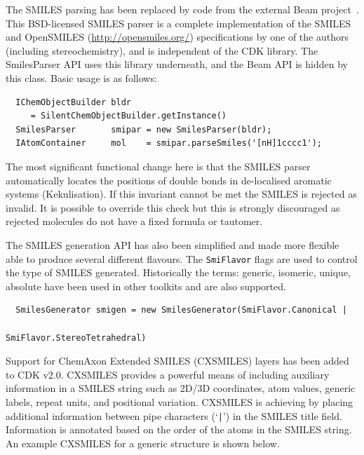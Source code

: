\documentclass[10pt]{bmcart}
\def \cdkversion {v2.0}
\begin{document}
The SMILES parsing has been replaced by code from the external Beam project~\cite{Beam}.
This BSD-licensed SMILES parser is a complete implementation of the SMILES
and OpenSMILES (\url{http://opensmiles.org/}) specifications by one of the
authors (including stereochemistry), and is independent of
the CDK library. The SmilesParser API uses this library underneath, and the
Beam API is hidden by this class. Basic usage is as follows:

\vspace{0.2cm}
\begin{verbatim}
  IChemObjectBuilder bldr 
     = SilentChemObjectBuilder.getInstance()
  SmilesParser       smipar = new SmilesParser(bldr);
  IAtomContainer     mol    = smipar.parseSmiles('[nH]1cccc1');
\end{verbatim}
\vspace{0.2cm}

The most significant functional change here is that the SMILES parser automatically 
locates the positions of double bonds in de-localised aromatic systems (Kekulisation).
If this invariant cannot be met the SMILES is rejected as invalid. It is 
possible to override this check but this is strongly discouraged as rejected
molecules do not have a fixed formula or tautomer.

The SMILES generation API has also been simplified and made more flexible able 
to produce several different flavours. The \texttt{SmiFlavor} flags are used
to control the type of SMILES generated. Historically the terms: generic, 
isomeric, unique, absolute have been used in other toolkits and are also 
supported.

\vspace{0.2cm}
\begin{verbatim}
  SmilesGenerator smigen = new SmilesGenerator(SmiFlavor.Canonical |
                                               SmiFlavor.StereoTetrahedral)
\end{verbatim}
\vspace{0.2cm}

Support for ChemAxon Extended SMILES (CXSMILES)\cite{CXSMILES} layers has been added
to CDK \cdkversion{}. CXSMILES provides a powerful means of including auxiliary 
information in a SMILES string such as 2D/3D coordinates, atom values, generic labels, 
repeat units, and positional variation. CXSMILES is achieving by placing additional
information between pipe characters (`\texttt{|}') in the SMILES title field. Information
is annotated based on the order of the atoms in the SMILES string. An example CXSMILES
for a generic structure is shown below.
\end{document}
